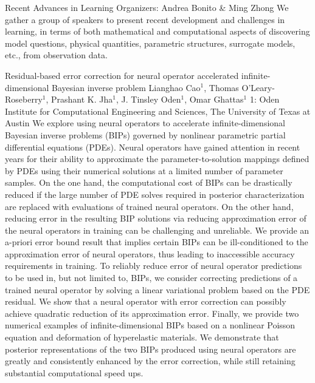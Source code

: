\label{mini17}

\miniabs
{Recent Advances in Learning}
{Organizers: Andrea Bonito \& Ming Zhong}
{We gather a group of speakers to present recent development and challenges in learning, in terms of both mathematical and computational aspects of discovering model questions, physical quantities, parametric structures, surrogate models, etc., from observation data. }

\begin{addmargin}[2em]{0em}
\vspace{2ex}
\abs
{Residual-based error correction for neural operator accelerated infinite-dimensional Bayesian inverse problem}
{Lianghao Cao$^1$, Thomas O'Leary-Roseberry$^1$, Prashant K. Jha$^1$, J. Tinsley Oden$^1$, Omar Ghattas$^1$}
{1: Oden Institute for Computational Engineering and Sciences, The University of Texas at Austin}
{We explore using neural operators to accelerate infinite-dimensional Bayesian inverse problems (BIPs) governed by nonlinear parametric partial differential equations (PDEs). Neural operators have gained attention in recent years for their ability to approximate the parameter-to-solution mappings defined by PDEs using their numerical solutions at a limited number of parameter samples. On the one hand, the computational cost of BIPs can be drastically reduced if the large number of PDE solves required in posterior characterization are replaced with evaluations of trained neural operators. On the other hand, reducing error in the resulting BIP solutions via reducing approximation error of the neural operators in training can be challenging and unreliable. We provide an a-priori error bound result that implies certain BIPs can be ill-conditioned to the approximation error of neural operators, thus leading to inaccessible accuracy requirements in training. To reliably reduce error of neural operator predictions to be used in, but not limited to, BIPs, we consider correcting predictions of a trained neural operator by solving a linear variational problem based on the PDE residual. We show that a neural operator with error correction can possibly achieve quadratic reduction of its approximation error. Finally, we provide two numerical examples of infinite-dimensional BIPs based on a nonlinear Poisson equation and deformation of hyperelastic materials. We demonstrate that posterior representations of the two BIPs produced using neural operators are greatly and consistently enhanced by the error correction, while still retaining substantial computational speed ups.}



\end{addmargin}
